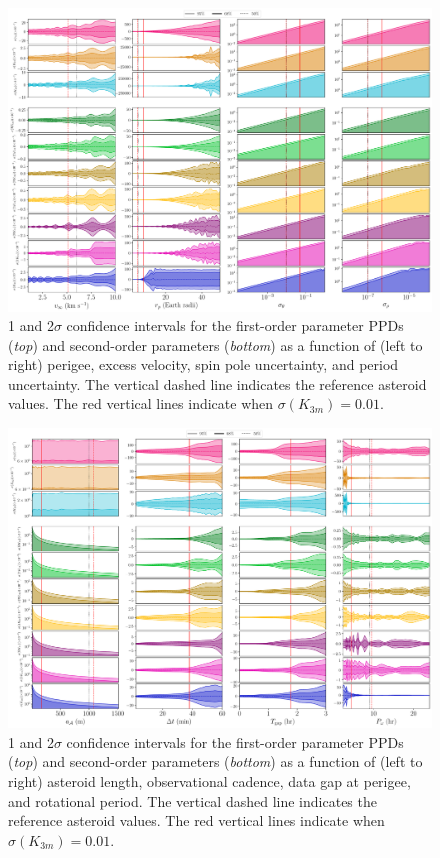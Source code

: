 \documentclass[fleqn,usenatbib]{mnras}
\begin{document}
\begin{figure}
  \centering
  \includegraphics[angle=90, origin=c, width=\linewidth]{figs/scan-all1.pdf}
  \caption{1 and 2$\sigma$ confidence intervals for the first-order parameter PPDs (\textit{top}) and second-order parameters (\textit{bottom}) as a function of (left to right) perigee, excess velocity, spin pole uncertainty, and period uncertainty. The vertical dashed line indicates the reference asteroid values. The red vertical lines indicate when $\sigma(K_{3m}) =0.01$.}
  \label{fig:scan-perigee}
  \label{fig:scan-vex}
  \label{fig:scan-am}
  \label{fig:scan-period}
  \label{fig:scan-physical}
\end{figure}

\begin{figure}
  \centering
  \includegraphics[angle=90, origin=c, width=\linewidth]{figs/scan-all2.pdf}
  \caption{1 and 2$\sigma$ confidence intervals for the first-order parameter PPDs (\textit{top}) and second-order parameters (\textit{bottom}) as a function of (left to right) asteroid length, observational cadence, data gap at perigee, and rotational period. The vertical dashed line indicates the reference asteroid values. The red vertical lines indicate when $\sigma(K_{3m}) =0.01$.}
    \label{fig:scan-rho}
    \label{fig:scan-theta}
    \label{fig:scan-cadence}
    \label{fig:observation-gap}
    \label{fig:scan-observational}
\end{figure}
\end{document}
